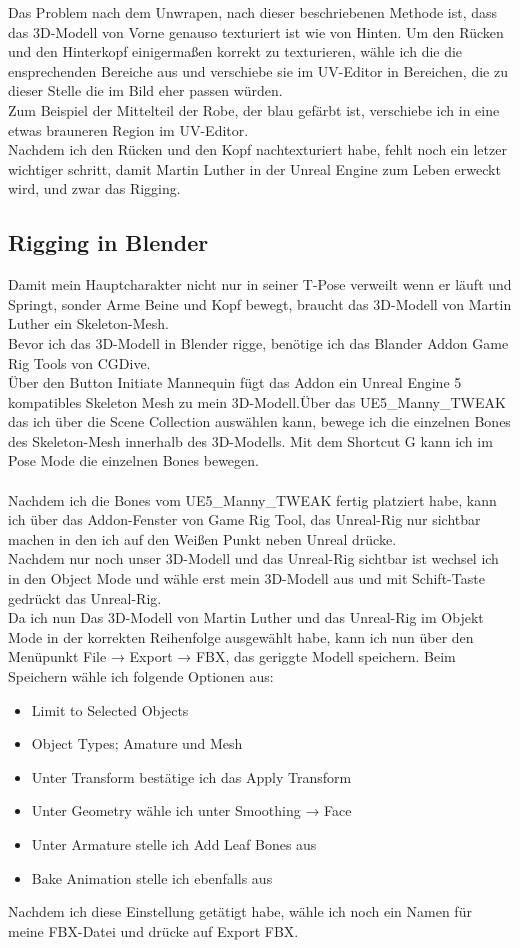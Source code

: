 Das Problem nach dem Unwrapen, nach dieser beschriebenen Methode ist, dass das 3D-Modell von Vorne genauso texturiert ist wie von Hinten. Um den Rücken und den Hinterkopf einigermaßen korrekt zu texturieren, wähle ich die die ensprechenden Bereiche aus und verschiebe sie im UV-Editor in Bereichen, die zu dieser Stelle die im Bild eher passen würden.
\\
Zum Beispiel der Mittelteil der Robe, der blau gefärbt ist, verschiebe ich in eine etwas brauneren Region im UV-Editor.
\\
Nachdem ich den Rücken und den Kopf nachtexturiert habe, fehlt noch ein letzer wichtiger schritt, damit Martin Luther in der Unreal Engine zum Leben erweckt wird, und zwar das Rigging.


\subsection{Rigging in Blender}%
Damit mein Hauptcharakter nicht nur in seiner T-Pose verweilt wenn er läuft und Springt, sonder Arme Beine und Kopf bewegt, braucht das 3D-Modell von Martin Luther ein Skeleton-Mesh.
\\
Bevor ich das 3D-Modell in Blender rigge, benötige ich das Blander Addon Game Rig Tools von CGDive.
\\
Über den Button Initiate Mannequin fügt das Addon ein Unreal Engine 5 kompatibles Skeleton Mesh zu mein 3D-Modell.Über das UE5\_Manny\_TWEAK das ich über die Scene Collection auswählen kann, bewege ich die einzelnen Bones des Skeleton-Mesh innerhalb des 3D-Modells. Mit dem Shortcut G kann ich im Pose Mode die einzelnen Bones bewegen.
\\
\\
Nachdem ich die Bones vom UE5\_Manny\_TWEAK fertig platziert habe, kann ich über das Addon-Fenster von Game Rig Tool, das Unreal-Rig nur sichtbar machen in den ich auf den Weißen Punkt neben Unreal drücke. 
\\
Nachdem nur noch unser 3D-Modell und das Unreal-Rig sichtbar ist wechsel ich in den Object Mode und wähle erst mein 3D-Modell aus und mit Schift-Taste gedrückt das Unreal-Rig.
\\
Da ich nun Das 3D-Modell von Martin Luther und das Unreal-Rig im Objekt Mode in der korrekten Reihenfolge ausgewählt habe, kann ich nun über den Menüpunkt File → Export → FBX, das geriggte Modell speichern. Beim Speichern wähle ich folgende Optionen aus:
\begin{itemize}
	\item Limit to Selected Objects 
	\item Object Types; Amature und Mesh
	\item Unter Transform bestätige ich das Apply Transform
	\item Unter Geometry wähle ich unter Smoothing → Face
	\item Unter Armature stelle ich Add Leaf Bones aus
	\item Bake Animation stelle ich ebenfalls aus
\end{itemize}
Nachdem ich diese Einstellung getätigt habe, wähle ich noch ein Namen für meine FBX-Datei und drücke auf Export FBX.

